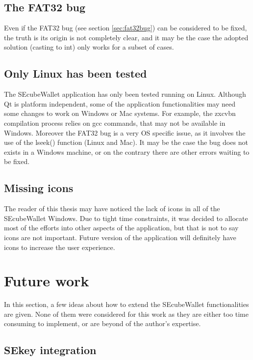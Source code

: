 \subsection{The FAT32 bug}

Even if the FAT32 bug (see section \ref{sec:fat32bug}) can be considered to be fixed, the truth is its origin is not completely clear, and it may be the case the adopted solution (casting to int) only works for a subset of cases.

\subsection{Only Linux has been tested}

The SEcubeWallet application has only been tested running on Linux. Although Qt is platform independent, some of the application functionalities may need some changes to work on Windows or Mac systems. For example, the zxcvbn compilation process relies on gcc commands, that may not be available in Windows. Moreover the FAT32 bug is a very OS specific issue, as it involves the use of the lseek() function (Linux and Mac). It may be the case the bug does not exists in a Windows machine, or on the contrary there are other errors waiting to be fixed.


\subsection{Missing icons}
The reader of this thesis may have noticed the lack of icons in all of the SEcubeWallet Windows. Due to tight time constraints, it was decided to allocate most of the efforts into other aspects of the application, but that is not to say icons are not important. Future version of the application will definitely have icons to increase the user experience.


\section{Future work}
In this section, a few ideas about how to extend the SEcubeWallet functionalities are given. None of them were considered for this work as they are either too time consuming to implement, or are beyond of the author's expertise.


\subsection{SEkey integration}

